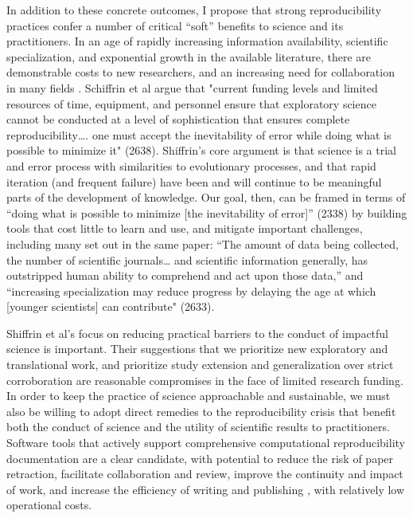 In addition to these concrete outcomes, I propose that strong reproducibility
practices confer a number of critical “soft” benefits to science and its
practitioners. In an age of rapidly increasing information availability,
scientific specialization, and exponential growth in the available literature,
there are demonstrable costs to new researchers, and an increasing need for
collaboration in many fields \parencite[2633-4]{shiffrin_scientific_2018}.
Schiffrin et al argue that "current funding levels and limited resources of
time, equipment, and personnel ensure that exploratory science cannot be
conducted at a level of sophistication that ensures complete reproducibility….
one must accept the inevitability of error while doing what is possible to
minimize it" (2638). Shiffrin’s core argument is that science is a trial and
error process with similarities to evolutionary processes, and that rapid
iteration (and frequent failure) have been and will continue to be meaningful
parts of the development of knowledge. Our goal, then, can be framed in terms of
“doing what is possible to minimize [the inevitability of error]” (2338) by building
tools that cost little to learn and use, and mitigate important challenges,
including many set out in the same paper: “The amount of data being collected,
the number of scientific journals… and scientific information generally, has
outstripped human ability to comprehend and act upon those data,” and
“increasing specialization may reduce progress by delaying the age at which
[younger scientists] can contribute" (2633).

Shiffrin et al’s focus on reducing practical barriers to the conduct of
impactful science is important. Their suggestions that we prioritize new
exploratory and translational work, and prioritize study extension and
generalization over strict corroboration are reasonable compromises in the face
of limited research funding. In order to keep the practice of science
approachable and sustainable, we must also be willing to adopt direct remedies
to the reproducibility crisis that benefit both the conduct of science and the
utility of scientific results to practitioners. Software tools that actively
support comprehensive computational reproducibility documentation are a clear
candidate, with potential to reduce the risk of paper retraction, facilitate
collaboration and review, improve the continuity and impact of work, and
increase the efficiency of writing and publishing \parencite{community_added_2021},
with relatively low operational costs.

